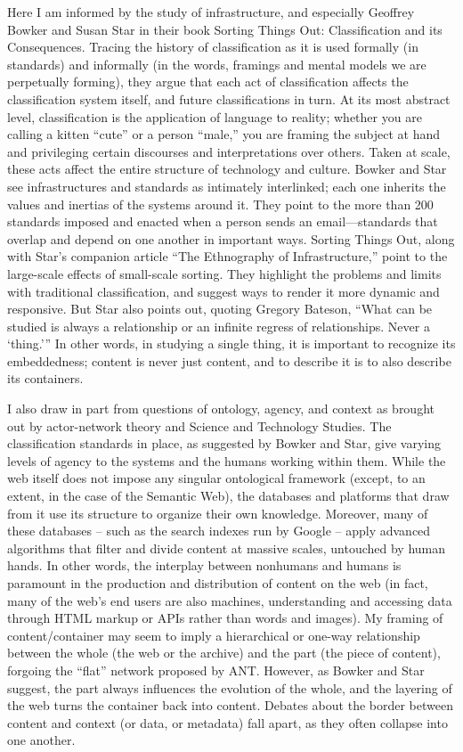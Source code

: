 Here I am informed by the study of infrastructure, and especially Geoffrey Bowker and Susan Star in their book Sorting Things Out: Classification and its Consequences. Tracing the history of classification as it is used formally (in standards) and informally (in the words, framings and mental models we are perpetually forming), they argue that each act of classification affects the classification system itself, and future classifications in turn. At its most abstract level, classification is the application of language to reality; whether you are calling a kitten “cute” or a person “male,” you are framing the subject at hand and privileging certain discourses and interpretations over others. Taken at scale, these acts affect the entire structure of technology and culture. Bowker and Star see infrastructures and standards as intimately interlinked; each one inherits the values and inertias of the systems around it. They point to the more than 200 standards imposed and enacted when a person sends an email—standards that overlap and depend on one another in important ways.  Sorting Things Out, along with Star’s companion article “The Ethnography of Infrastructure,” point to the large-scale effects of small-scale sorting. They highlight the problems and limits with traditional classification, and suggest ways to render it more dynamic and responsive. But Star also points out, quoting Gregory Bateson, “What can be studied is always a relationship or an infinite regress of relationships. Never a ‘thing.’”  In other words, in studying a single thing, it is important to recognize its embeddedness; content is never just content, and to describe it is to also describe its containers.

I also draw in part from questions of ontology, agency, and context as brought out by actor-network theory and Science and Technology Studies.  The classification standards in place, as suggested by Bowker and Star, give varying levels of agency to the systems and the humans working within them. While the web itself does not impose any singular ontological framework (except, to an extent, in the case of the Semantic Web), the databases and platforms that draw from it use its structure to organize their own knowledge. Moreover, many of these databases – such as the search indexes run by Google – apply advanced algorithms that filter and divide content at massive scales, untouched by human hands. In other words, the interplay between nonhumans and humans is paramount in the production and distribution of content on the web (in fact, many of the web’s end users are also machines, understanding and accessing data through HTML markup or APIs rather than words and images). My framing of content/container may seem to imply a hierarchical or one-way relationship between the whole (the web or the archive) and the part (the piece of content), forgoing the “flat” network proposed by ANT. However, as Bowker and Star suggest, the part always influences the evolution of the whole, and the layering of the web turns the container back into content. Debates about the border between content and context (or data, or metadata) fall apart, as they often collapse into one another.


